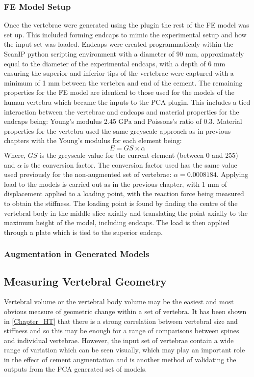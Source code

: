 \subsubsection{FE Model Setup}

Once the vertebrae were generated using the plugin the rest of the FE model was
set up.  This included forming endcaps to mimic the experimental setup and how
the input set was loaded.  Endcaps were created programmaticaly within the
ScanIP python scripting environment with a diameter of 90 mm, approximately
equal to the diameter of the experimental endcaps, with a depth of 6 mm
ensuring the superior and inferior tips of the vertebrae were captured with a
minimum of 1 mm between the vertebra and end of the cement.  The remaining
properties for the FE model are identical to those used for the models of the
human vertebra which became the inputs to the PCA plugin.  This includes a tied
interaction between the vertebrae and endcaps and material properties for the
endcaps being: Young's modulus 2.45 GPa and Poissons's ratio of 0.3.  Material
properties for the vertebra used the same greyscale approach as in previous
chapters with the Young's modulus for each element being: \[ E = GS \times
\alpha \] Where, $GS$ is the greyscale value for the current element (between 0
and 255) and $\alpha$ is the conversion factor.  The conversion factor used has
the same value used previously for the non-augmented set of vertebrae: $\alpha
= 0.0008184$.  Applying load to the models is carried out as in the previous
chapter, with 1 mm of displacement applied to a loading point, with the
reaction force being measured to obtain the stiffness.  The loading point is
found by finding the centre of the vertebral body in the middle slice axially
and translating the point axially to the maximum height of the model, including
endcaps.  The load is then applied through a plate which is tied to the
superior endcap.

\subsubsection{Augmentation in Generated Models}


\subsection{Measuring Vertebral Geometry}

Vertebral volume or the vertebral body volume may be the easiest and most
obvious measure of geometric change within a set of vertebra.  It has been
shown in \cref{Chapter_HT} that there is a strong correlation between
vertebral size and stiffness and so this may be enough for a range of
comparisons between spines and individual vertebrae.  However, the input set of
vertebrae contain a wide range of variation which can be seen visually, which
may play an important role in the effect of cement augmentation and is another
method of validating the outputs from the PCA generated set of models.

